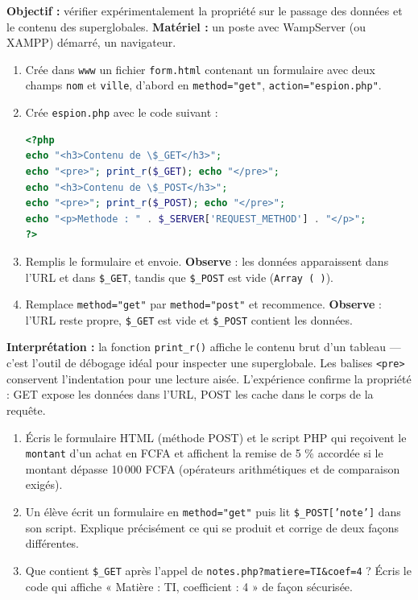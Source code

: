 \documentclass[11pt]{article}
\begin{document}
\begin{experience}
\textbf{Objectif :} vérifier expérimentalement la propriété sur le passage des données et le contenu des superglobales. \textbf{Matériel :} un poste avec WampServer (ou XAMPP) démarré, un navigateur.
\begin{enumerate}
\item Crée dans \texttt{www} un fichier \texttt{form.html} contenant un formulaire avec deux champs \texttt{nom} et \texttt{ville}, d'abord en \texttt{method="get"}, \texttt{action="espion.php"}.
\item Crée \texttt{espion.php} avec le code suivant :
\begin{lstlisting}[language=Php]
<?php
echo "<h3>Contenu de \$_GET</h3>";
echo "<pre>"; print_r($_GET); echo "</pre>";
echo "<h3>Contenu de \$_POST</h3>";
echo "<pre>"; print_r($_POST); echo "</pre>";
echo "<p>Methode : " . $_SERVER['REQUEST_METHOD'] . "</p>";
?>
\end{lstlisting}
\item Remplis le formulaire et envoie. \textbf{Observe} : les données apparaissent dans l'URL et dans \texttt{\$\_GET}, tandis que \texttt{\$\_POST} est vide (\texttt{Array ( )}).
\item Remplace \texttt{method="get"} par \texttt{method="post"} et recommence. \textbf{Observe} : l'URL reste propre, \texttt{\$\_GET} est vide et \texttt{\$\_POST} contient les données.
\end{enumerate}
\textbf{Interprétation :} la fonction \texttt{print\_r()} affiche le contenu brut d'un tableau — c'est l'outil de débogage idéal pour inspecter une superglobale. Les balises \texttt{<pre>} conservent l'indentation pour une lecture aisée. L'expérience confirme la propriété : GET expose les données dans l'URL, POST les cache dans le corps de la requête.
\end{experience}

\begin{exercice}
\begin{enumerate}
\item Écris le formulaire HTML (méthode POST) et le script PHP qui reçoivent le \texttt{montant} d'un achat en FCFA et affichent la remise de 5 \% accordée si le montant dépasse 10\,000 FCFA (opérateurs arithmétiques et de comparaison exigés).
\item Un élève écrit un formulaire en \texttt{method="get"} puis lit \texttt{\$\_POST['note']} dans son script. Explique précisément ce qui se produit et corrige de deux façons différentes.
\item Que contient \texttt{\$\_GET} après l'appel de \texttt{notes.php?matiere=TI\&coef=4} ? Écris le code qui affiche « Matière : TI, coefficient : 4 » de façon sécurisée.
\end{enumerate}
\end{exercice}
\end{document}
